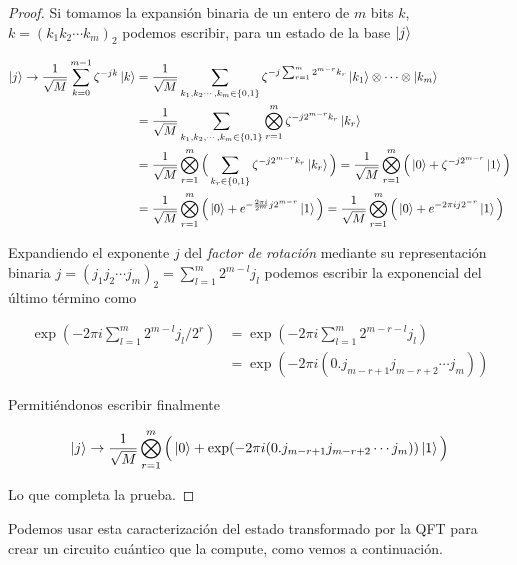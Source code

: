 \documentclass[11pt, spanish]{report}
\numberwithin{equation}{section}
\numberwithin{defin}{section}
\begin{document}
\begin{proof}

Si tomamos la expansión binaria de un entero de $m$ bits $k$, $k=(k_1k_2\cdots k_m)_2$ podemos escribir, para un estado de la base $\ket{j}$

\begin{equation}
\begin{split}
\ket{j}\rightarrow \frac{1}{\sqrt{M}}\sum_{k=0}^{m-1}\zeta^{-jk}\ket{k}&=\frac{1}{\sqrt{M}}\sum_{k_1,k_2\cdots,k_m\in\{0,1\}}\zeta^{-j\sum_{r=1}^m 2^{m-r}k_r} \ket{k_1}\otimes\cdots\otimes\ket{k_m}\\
&=\frac{1}{\sqrt{M}}\sum_{k_1,k_2,\cdots,k_m\in\{0,1\}} \bigotimes_{r=1}^m \zeta^{-j2^{m-r}k_r}\ket{k_r}\\
&=\frac{1}{\sqrt{M}}\bigotimes_{r=1}^m\Big(\sum_{k_r\in\{0,1\}}\zeta^{-j2^{m-r}k_r}\ket{k_r} \Big)=\frac{1}{\sqrt{M}}\bigotimes_{r=1}^m\Big(\ket{0}+\zeta^{-j2^{m-r}}\ket{1}\Big)\\
&=\frac{1}{\sqrt{M}}\bigotimes_{r=1}^m\Big(\ket{0}+e^{-\frac{2\pi i}{2^m}j2^{m-r}}\ket{1}\Big)=\frac{1}{\sqrt{M}}\bigotimes_{r=1}^m\Big(\ket{0}+e^{-2\pi ij2^{-r}}\ket{1}\Big)
\end{split}
\end{equation}

Expandiendo el exponente $j$ del \textit{factor de rotación} mediante su representación binaria $j=(j_1j_2\cdots j_m)_2=\sum_{l=1}^m 2^{m-l}j_l$ podemos escribir la exponencial del último término como

\begin{equation}
\begin{split}
\exp(-2\pi i\sum_{l=1}^m 2^{m-l}j_l/2^r)&=\exp(-2\pi i\sum_{l=1}^m 2^{m-r-l}j_l)\\
&=\exp(-2\pi i(0.j_{m-r+1}j_{m-r+2}\cdots j_m))
\end{split}
\end{equation}

Permitiéndonos escribir finalmente

\begin{equation}
\ket{j}\rightarrow \frac{1}{\sqrt{M}}\bigotimes_{r=1}^m\Big(\ket{0}+\exp(-2\pi i(0.j_{m-r+1}j_{m-r+2}\cdots j_m))\ket{1}\Big)
\end{equation}

Lo que completa la prueba.
\end{proof}

Podemos usar esta caracterización del estado transformado por la QFT para crear un circuito cuántico que la compute, como vemos a continuación.\\
\end{document}
